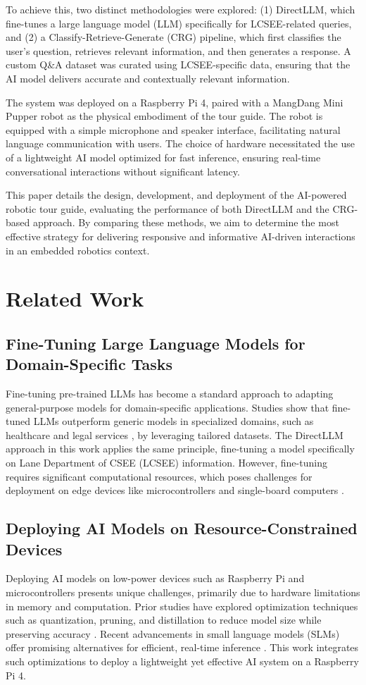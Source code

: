 \documentclass[conference]{IEEEtran}
\begin{document}
To achieve this, two distinct methodologies were explored: 
(1) DirectLLM, which fine-tunes a large language model (LLM) specifically for LCSEE-related queries, and 
(2) a Classify-Retrieve-Generate (CRG) pipeline, which first classifies the user's question, retrieves relevant information, and then generates a response. 
A custom Q\&A dataset was curated using LCSEE-specific data, ensuring that the AI model delivers accurate and contextually relevant information.

The system was deployed on a Raspberry Pi 4, paired with a MangDang Mini Pupper \cite{b1} robot as the physical embodiment of the tour guide. 
The robot is equipped with a simple microphone and speaker interface, facilitating natural language communication with users. 
The choice of hardware necessitated the use of a lightweight AI model optimized for fast inference, ensuring real-time conversational interactions without significant latency.

This paper details the design, development, and deployment of the AI-powered robotic tour guide, evaluating the performance of both DirectLLM and the CRG-based approach. 
By comparing these methods, we aim to determine the most effective strategy for delivering responsive and informative AI-driven interactions in an embedded robotics context.

\section{Related Work}
\subsection{Fine-Tuning Large Language Models for Domain-Specific Tasks}
Fine-tuning pre-trained LLMs has become a standard approach to adapting general-purpose models for domain-specific applications. 
Studies show that fine-tuned LLMs outperform generic models in specialized domains, such as healthcare and legal services \cite{b2}, by leveraging tailored datasets. 
The DirectLLM approach in this work applies the same principle, fine-tuning a model specifically on Lane Department of CSEE (LCSEE) information. 
However, fine-tuning requires significant computational resources, which poses challenges for deployment on edge devices like microcontrollers and single-board computers \cite{b3}.

\subsection{Deploying AI Models on Resource-Constrained Devices}
Deploying AI models on low-power devices such as Raspberry Pi and microcontrollers presents unique challenges, primarily due to hardware limitations in memory and computation. 
Prior studies have explored optimization techniques such as quantization, pruning, and distillation to reduce model size while preserving accuracy \cite{b4}. 
Recent advancements in small language models (SLMs) offer promising alternatives for efficient, real-time inference \cite{b5}. 
This work integrates such optimizations to deploy a lightweight yet effective AI system on a Raspberry Pi 4.
\end{document}
